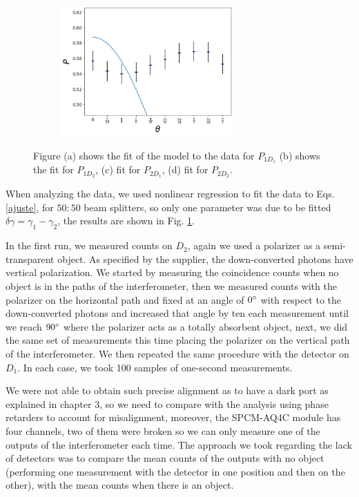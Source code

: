 \documentclass[12pt]{book}
\begin{document}
\begin{figure}[t!]
\begin{subfigure}[b]{0.45\linewidth}
\caption{}
\end{subfigure}
\begin{subfigure}[b]{0.45\linewidth}
\includegraphics[width=\linewidth,height=5cm]{images/ajuste_miercoles_22.png}
\caption{}
\end{subfigure}
\caption{Figure (a) shows the fit of the model to the data for $P_{1D_{1}}$ (b) shows the fit for $P_{1D_{2}}$, (c) fit for $P_{2D_{1}}$, (d) fit for $P_{2D_{2}}$.}
\label{ajustes}
\end{figure}

When analyzing the data, we used nonlinear regression to fit the data to Eqs. \ref{ajuste}, for $50:50$ beam splitters, so only one parameter was due to be fitted $\delta\gamma=\gamma_{1}-\gamma_{2}$, the results are shown in Fig. \ref{ajustes}.

In the first run, we measured counts on $D_{2}$, again we used a polarizer as a semi-transparent object. As specified by the supplier, the down-converted photons have vertical polarization. We started by measuring the coincidence counts when no object is in the paths of the interferometer, then we measured counts with the polarizer on the horizontal path and fixed at an angle of $0\degree$ with respect to the down-converted photons and increased that angle by ten each measurement until we reach $90\degree$ where the polarizer acts as a totally absorbent object, next, we did the same set of measurements this time placing the polarizer on the vertical path of the interferometer. We then repeated the same procedure with the detector on $D_{1}$. In each case, we took 100 samples of one-second measurements.


 We were not able to obtain such precise alignment as to have a dark port as explained in chapter 3, so we need to compare with the analysis using phase retarders to account for misalignment, moreover, the SPCM-AQ4C module has four channels, two of them were broken so we can only measure one of the outputs of the interferometer each time. The approach we took regarding the lack of detectors was to compare the mean counts of the outputs with no object (performing one measurement with the detector in one position and then on the other), with the mean counts when there is an object.
 
\end{document}
